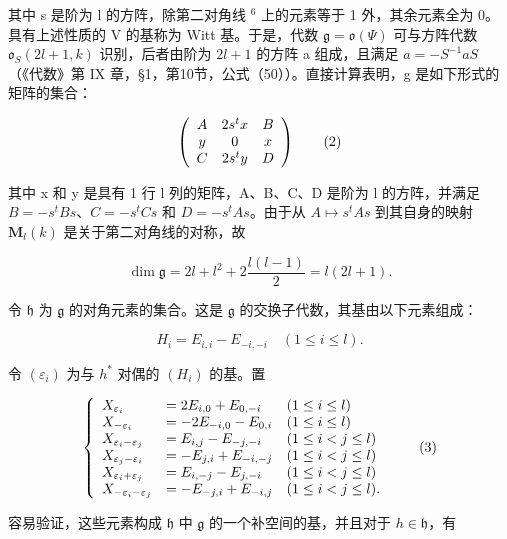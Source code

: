 其中 s 是阶为 l 的方阵，除第二对角线 \(^{6}\) 上的元素等于 1 外，其余元素全为 0。具有上述性质的 V 的基称为 Witt 基。于是，代数 \(\mathfrak{g} = \mathfrak{o}(\varPsi)\) 可与方阵代数 \(\mathfrak{o}_{S}(2l + 1, k)\) 识别，后者由阶为 \(2l + 1\) 的方阵 a 组成，且满足 \(a = -S^{-1}aS\)（《代数》第 IX 章，§1，第10节，公式（50））。直接计算表明，g 是如下形式的矩阵的集合：

\[
\left( \begin{array}{c c c} A & 2 s ^ {t} x & B \\ y & 0 & x \\ C & 2 s ^ {t} y & D \end{array} \right)\tag{2}
\]

其中 x 和 y 是具有 1 行 l 列的矩阵，A、B、C、D 是阶为 l 的方阵，并满足 \(B = -s^{t}Bs\)、\(C = -s^{t}Cs\) 和 \(D = -s^{t}As\)。由于从 \(A \mapsto s^{t}As\) 到其自身的映射 \(\mathbf{M}_{l}(k)\) 是关于第二对角线的对称，故

\[
\dim \mathfrak {g} = 2 l + l ^ {2} + 2 \frac {l (l - 1)}{2} = l (2 l + 1).
\]

令 \(\mathfrak{h}\) 为 \(\mathfrak{g}\) 的对角元素的集合。这是 \(\mathfrak{g}\) 的交换子代数，其基由以下元素组成：


\[
H _ {i} = E _ {i, i} - E _ {- i, - i} \quad (1 \leq i \leq l).
\]

令 \((\varepsilon_{i})\) 为与 \(h^{*}\) 对偶的 \((H_{i})\) 的基。置

\[
\left\{ \begin{array}{l l l} X _ {\varepsilon_ {i}} & = 2 E _ {i, 0} + E _ {0, - i} & (1 \leq i \leq l) \\ X _ {- \varepsilon_ {i}} & = - 2 E _ {- i, 0} - E _ {0, i} & (1 \leq i \leq l) \\ X _ {\varepsilon_ {i} - \varepsilon_ {j}} & = E _ {i, j} - E _ {- j, - i} & (1 \leq i <   j \leq l) \\ X _ {\varepsilon_ {j} - \varepsilon_ {i}} & = - E _ {j, i} + E _ {- i, - j} & (1 \leq i <   j \leq l) \\ X _ {\varepsilon_ {i} + \varepsilon_ {j}} & = E _ {i, - j} - E _ {j, - i} & (1 \leq i <   j \leq l) \\ X _ {- \varepsilon_ {i} - \varepsilon_ {j}} & = - E _ {- j, i} + E _ {- i, j} & (1 \leq i <   j \leq l). \end{array} \right.\tag{3}
\]

容易验证，这些元素构成 \(\mathfrak{h}\) 中 \(\mathfrak{g}\) 的一个补空间的基，并且对于 \(h\in \mathfrak{h}\)，有

